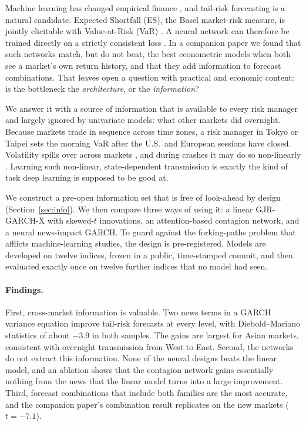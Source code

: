 Machine learning has changed empirical finance \citep{gu2020empirical}, and tail-risk forecasting is a natural candidate. Expected Shortfall (ES), the Basel market-risk measure, is jointly elicitable with Value-at-Risk (VaR) \citep{fissler2016higher}. A neural network can therefore be trained directly on a strictly consistent loss \citep{patton2019dynamic}. In a companion paper \citep{agrawal2026learning} we found that such networks match, but do not beat, the best econometric models when both see a market's own return history, and that they add information to forecast combinations. That leaves open a question with practical and economic content: is the bottleneck the \emph{architecture}, or the \emph{information}?

We answer it with a source of information that is available to every risk manager and largely ignored by univariate models: what other markets did overnight. Because markets trade in sequence across time zones, a risk manager in Tokyo or Taipei sets the morning VaR after the U.S.\ and European sessions have closed. Volatility spills over across markets \citep{engle1990meteor,hamao1990correlations,lin1994do,diebold2009measuring,diebold2012better}, and during crashes it may do so non-linearly \citep{forbes2002no}. Learning such non-linear, state-dependent transmission is exactly the kind of task deep learning is supposed to be good at.

We construct a pre-open information set that is free of look-ahead by design (Section~\ref{sec:info}). We then compare three ways of using it: a linear GJR-GARCH-X with skewed-$t$ innovations, an attention-based contagion network, and a neural news-impact GARCH. To guard against the forking-paths problem that afflicts machine-learning studies, the design is pre-registered. Models are developed on twelve indices, frozen in a public, time-stamped commit, and then evaluated exactly once on twelve further indices that no model had seen.

\paragraph{Findings.} First, cross-market information is valuable. Two news terms in a GARCH variance equation improve tail-risk forecasts at every level, with Diebold--Mariano statistics of about $-3.9$ in both samples. The gains are largest for Asian markets, consistent with overnight transmission from West to East. Second, the networks do not extract this information. None of the neural designs beats the linear model, and an ablation shows that the contagion network gains essentially nothing from the news that the linear model turns into a large improvement. Third, forecast combinations that include both families are the most accurate, and the companion paper's combination result replicates on the new markets ($t=-7.1$).

